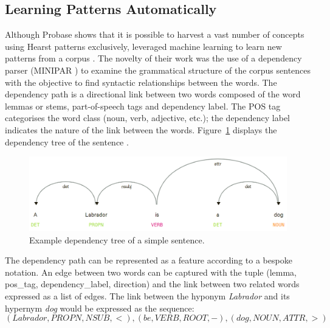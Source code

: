 \subsection{Learning Patterns Automatically} \label{Learning Patterns Automatically}
Although Probase shows that it is possible to harvest a vast number of concepts using Hearst patterns 
exclusively, \citeauthor{Snow2004} leveraged machine learning to learn new patterns from a corpus \citep{Snow2004}.  The novelty of their work was the use of a dependency parser (MINIPAR \citep{lin2003dependency}) %
to examine the grammatical structure of the corpus sentences with the objective to find syntactic relationships between the words.  The dependency path is a directional link between two words composed of the word lemmas or stems, part-of-speech tags and dependency label.  The \ac{POS} tag categorises the word class (noun, verb, adjective, etc.); the dependency label indicates the nature of the link between the words.  Figure~\ref{fig:simple_dep_tree} displays the dependency tree of the sentence .
\begin{figure}[ht!] %
  \centering
  \includegraphics[width=1.\linewidth]{images/dependency_parse.png}
  \caption{Example dependency tree of a simple sentence.}%
  \label{fig:simple_dep_tree}
\end{figure}


The dependency path can be represented as a feature according to a bespoke notation.  An edge between two words can be captured with the tuple (lemma, pos\_tag, dependency\_label, direction) and the link between two related words expressed as a list of edges.  The link between the hyponym \textit{Labrador} and its hypernym \textit{dog} would be expressed as the sequence:
\[(Labrador, PROPN, NSUB, <), (be, VERB, ROOT, -),(dog, NOUN, ATTR, >)\]

